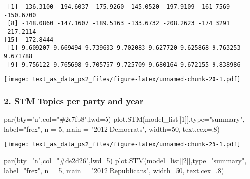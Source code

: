 \documentclass[
]{article}
\newenvironment{Shaded}{\begin{snugshade}}{\end{snugshade}}
\newcommand{\AttributeTok}[1]{\textcolor[rgb]{0.77,0.63,0.00}{#1}}
\newcommand{\DecValTok}[1]{\textcolor[rgb]{0.00,0.00,0.81}{#1}}
\newcommand{\FunctionTok}[1]{\textcolor[rgb]{0.00,0.00,0.00}{#1}}
\newcommand{\NormalTok}[1]{#1}
\newcommand{\StringTok}[1]{\textcolor[rgb]{0.31,0.60,0.02}{#1}}
\begin{document}
\begin{verbatim}
 [1] -136.3100 -194.6037 -175.9260 -145.0520 -197.9109 -161.7569 -150.6700
 [8] -148.0860 -147.1607 -189.5163 -133.6732 -208.2623 -174.3291 -217.2114
[15] -172.8444
 [1] 9.609207 9.669494 9.739603 9.702083 9.627720 9.625868 9.763253 9.671788
 [9] 9.756122 9.765698 9.705767 9.725709 9.680164 9.672155 9.838986
\end{verbatim}

\texttt{[image: text\_as\_data\_ps2\_files/figure-latex/unnamed-chunk-20-1.pdf]}

\hypertarget{stm-topics-per-party-and-year}{%
\subsubsection{2. STM Topics per party and
year}\label{stm-topics-per-party-and-year}}

\begin{Shaded}
\begin{Highlighting}[]
\FunctionTok{par}\NormalTok{(}\AttributeTok{bty=}\StringTok{"n"}\NormalTok{,}\AttributeTok{col=}\StringTok{"\#2c7fb8"}\NormalTok{,}\AttributeTok{lwd=}\DecValTok{5}\NormalTok{)}
\FunctionTok{plot.STM}\NormalTok{(model\_list[[}\DecValTok{1}\NormalTok{]],}\AttributeTok{type=}\StringTok{"summary"}\NormalTok{, }\AttributeTok{label=}\StringTok{"frex"}\NormalTok{, }\AttributeTok{n =} \DecValTok{5}\NormalTok{, }\AttributeTok{main =} \StringTok{"2012 Democrats"}\NormalTok{, }
         \AttributeTok{width=}\DecValTok{50}\NormalTok{, }\AttributeTok{text.cex=}\NormalTok{.}\DecValTok{8}\NormalTok{)}
\end{Highlighting}
\end{Shaded}

\texttt{[image: text\_as\_data\_ps2\_files/figure-latex/unnamed-chunk-23-1.pdf]}

\begin{Shaded}
\begin{Highlighting}[]
\FunctionTok{par}\NormalTok{(}\AttributeTok{bty=}\StringTok{"n"}\NormalTok{,}\AttributeTok{col=}\StringTok{"\#de2d26"}\NormalTok{,}\AttributeTok{lwd=}\DecValTok{5}\NormalTok{)}
\FunctionTok{plot.STM}\NormalTok{(model\_list[[}\DecValTok{2}\NormalTok{]],}\AttributeTok{type=}\StringTok{"summary"}\NormalTok{, }\AttributeTok{label=}\StringTok{"frex"}\NormalTok{, }\AttributeTok{n =} \DecValTok{5}\NormalTok{, }\AttributeTok{main =} \StringTok{"2012 Republicans"}\NormalTok{, }
        \AttributeTok{width=}\DecValTok{50}\NormalTok{, }\AttributeTok{text.cex=}\NormalTok{.}\DecValTok{8}\NormalTok{)}
\end{Highlighting}
\end{Shaded}
\end{document}
